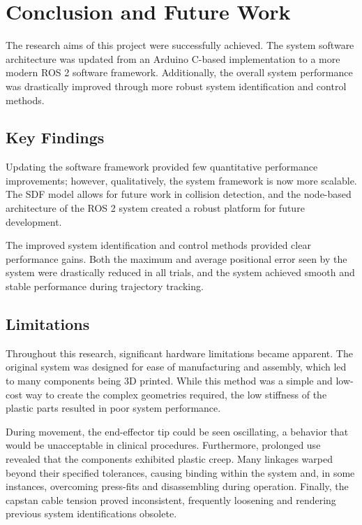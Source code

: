 \chapter{Conclusion and Future Work}
\label{chapter:conclusion}

The research aims of this project were successfully achieved. The system software architecture was updated from an Arduino C-based implementation to a more modern ROS 2 software framework. Additionally, the overall system performance was drastically improved through more robust system identification and control methods.

\section{Key Findings}
\label{section:key_findings}

Updating the software framework provided few quantitative performance improvements; however, qualitatively, the system framework is now more scalable. The SDF model allows for future work in collision detection, and the node-based architecture of the ROS 2 system created a robust platform for future development.

The improved system identification and control methods provided clear performance gains. Both the maximum and average positional error seen by the system were drastically reduced in all trials, and the system achieved smooth and stable performance during trajectory tracking.


\section{Limitations}
\label{section:limitations}

Throughout this research, significant hardware limitations became apparent. The original system was designed for ease of manufacturing and assembly, which led to many components being 3D printed. While this method was a simple and low-cost way to create the complex geometries required, the low stiffness of the plastic parts resulted in poor system performance.

During movement, the end-effector tip could be seen oscillating, a behavior that would be unacceptable in clinical procedures. Furthermore, prolonged use revealed that the components exhibited plastic creep. Many linkages warped beyond their specified tolerances, causing binding within the system and, in some instances, overcoming press-fits and disassembling during operation. Finally, the capstan cable tension proved inconsistent, frequently loosening and rendering previous system identifications obsolete. 

